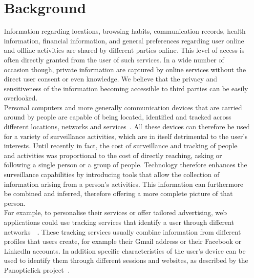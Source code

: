 \documentclass[runningheads,a4paper]{llncs}
\begin{document}
\section{Background}

Information regarding locations, browsing habits, communication records, health information, financial information, and general preferences regarding user online and offline activities are shared by different parties online. This level of access is often directly granted from the user of such services. In a wide number of occasion though, private information are captured by online services without the direct user consent or even knowledge. We believe that the privacy and sensitiveness of the information becoming accessible to third parties can be easily overlooked. 
\\
Personal computers and more generally communication devices that are carried around by people are capable of being located, identified and tracked across different locations, networks and services~\cite{michael2013location}. All these devices can therefore be used for a variety of surveillance activities, which are in itself detrimental to the user's interests. Until recently in fact, the cost of surveillance and tracking of people and activities was proportional to the cost of directly reaching, asking or following a single person or a group of people. Technology therefore enhances the surveillance capabilities by introducing tools that allow the collection of information arising from a person's activities. This information can furthermore be combined and inferred, therefore offering a more complete picture of that person. 
\\
For example, to personalise their services or offer tailored advertising, web applications could use tracking services that identify a user through different networks~\cite{veeningen2014line}~\cite{getoor2012entity}. These tracking services usually combine information from different profiles that users create, for example their Gmail address or their Facebook or LinkedIn accounts. In addition specific characteristics of the user's device can be used to identify them through different sessions and websites, as described by the Panopticlick project~\cite{eckersley2011panopticlick}.
\\
\end{document}
